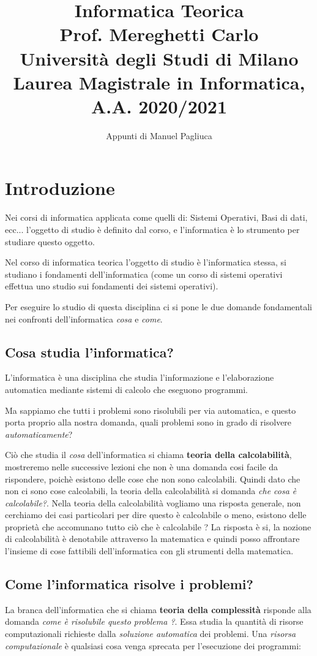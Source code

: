 \documentclass{article}
\title{%
  \textbf{Informatica Teorica}\\
  \large Prof. Mereghetti Carlo\\
    Università degli Studi di Milano\\
    Laurea Magistrale in Informatica, A.A. 2020/2021}
\author{Appunti di Manuel Pagliuca}
\begin{document}
\maketitle
\pagebreak
\tableofcontents
\pagebreak
\newpage
\section{Introduzione}
Nei corsi di informatica applicata come quelli di: Sistemi Operativi, Basi di dati, ecc... l'oggetto di studio è definito dal corso, e l'informatica è lo strumento per studiare questo oggetto.

Nel corso di informatica teorica l'oggetto di studio è l'informatica stessa, si studiano i fondamenti dell'informatica (come un corso di sistemi operativi effettua uno studio sui fondamenti dei sistemi operativi).

Per eseguire lo studio di questa disciplina ci si pone le due domande fondamentali nei confronti dell'informatica \textit{cosa} e \textit{come}.
\subsection{Cosa studia l'informatica?}
L'informatica è una disciplina che studia l'informazione e l'elaborazione automatica mediante sistemi di calcolo che eseguono programmi.

Ma sappiamo che tutti i problemi sono risolubili per via automatica, e questo porta proprio alla nostra domanda, quali problemi sono in grado di risolvere \textit{automaticamente}?

Ciò che studia il \textit{cosa} dell'informatica si chiama \textbf{teoria della calcolabilità}, mostreremo nelle successive lezioni che non è una domanda cosi facile da rispondere, poichè esistono delle cose che non sono calcolabili. Quindi dato che non ci sono cose calcolabili, la teoria della calcolabilità si domanda \textit{che cosa è calcolabile?}.
\newline
Nella teoria della calcolabilità vogliamo una risposta generale, non cerchiamo dei casi particolari per dire questo è calcolabile o meno, esistono delle proprietà che accomunano tutto ciò che è calcolabile ? La risposta è si, la nozione di calcolabilità è denotabile attraverso la matematica e quindi posso affrontare l'insieme di cose fattibili dell'informatica con gli strumenti della matematica.
\subsection{Come l'informatica risolve i problemi?}
La branca dell'informatica che si chiama \textbf{teoria della complessità} risponde alla domanda \textit{come è risolubile questo problema ?}. Essa studia la quantità di risorse computazionali richieste dalla \textit{soluzione automatica} dei problemi. Una \textit{risorsa computazionale} è qualsiasi cosa venga sprecata per l'esecuzione dei programmi:
\end{document}
